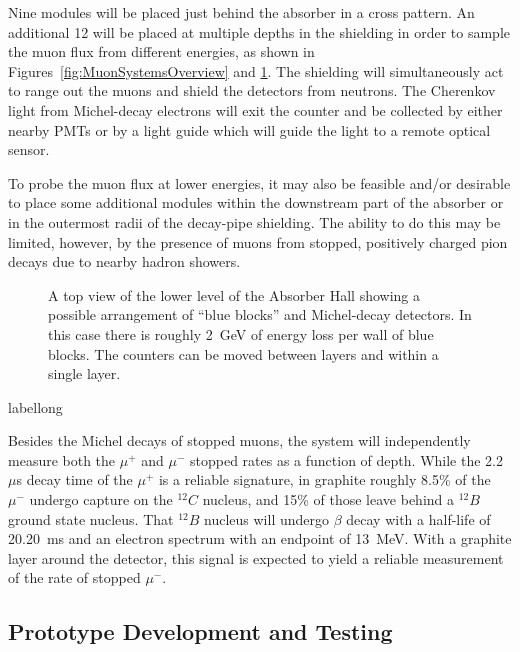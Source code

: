 Nine modules will be placed just behind the absorber in a cross pattern.  An additional 12 will be 
placed at multiple depths in the
shielding in order to sample the muon flux
from different energies, as shown in Figures~\ref{fig:MuonSystemsOverview} and \ref{fig:StoppedMuonLayout}. 
The shielding will simultaneously act to range out the muons and shield the detectors from 
neutrons. The Cherenkov light from Michel-decay electrons will exit the 
counter and be collected by either nearby PMTs or by a light guide which will
guide the light to a remote optical sensor.  

To probe the muon flux at lower energies, it may also
be feasible and/or desirable to place some additional modules within
the downstream part of the absorber or in the outermost radii of the
decay-pipe shielding. The ability to do this may be limited, however,
by the presence of muons from stopped, positively charged pion decays
due to nearby hadron showers.


\begin{figure}[htbp]
\begin{center}
\caption[Arrangement of blue blocks and Michel-decay detectors]{A top view of the 
lower level of the Absorber Hall showing a possible arrangement of ``blue blocks'' 
and Michel-decay detectors. In this case there is roughly 2~GeV of energy loss 
per wall of blue blocks. The counters can be moved between layers and within a single layer.}
\label{fig:StoppedMuonLayout}
\end{center}
\end{figure}
\begin{cdrfigure}[short]{label}{long}
\end{cdrfigure}

Besides the Michel decays of stopped muons, the system will
independently measure both the $\mu ^{+}$ and $\mu ^{-}$ stopped
rates as a function of depth. 
While the 2.2~$\mu $s decay time of the $\mu^+$ is a reliable
signature, in graphite roughly 8.5\% of the $\mu^{-}$ undergo capture
on the $^{12}C$ nucleus, and 15\% of those leave behind a $^{12}B$
ground state nucleus. That $^{12}B$ nucleus will undergo $\beta$ decay
with a half-life of 20.20~ms and an electron spectrum with an endpoint
of 13~MeV. With a graphite layer around the detector, this signal is
expected to yield a reliable measurement of the rate of stopped
$\mu^{-}$.

\subsection{Prototype Development and Testing}

